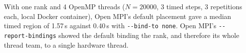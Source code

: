 With one rank and 4 OpenMP threads ($N=20000$, 3 timed steps, 3 repetitions each, local Docker container), Open MPI's default placement gave a median timed region of 1.57\,s against 0.40\,s with \texttt{-{}-bind-to none}. Open MPI's \texttt{-{}-report-bindings} showed the default binding the rank, and therefore its whole thread team, to a single hardware thread.
